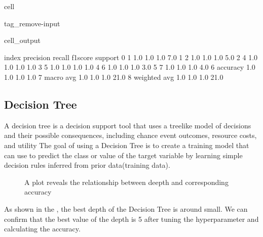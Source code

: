 \documentclass[letterpaper,10pt,english]{jupyterBook}
\let\sphinxpxdimen\pdfpxdimen\else\newdimen\sphinxpxdimen
\begin{document}
\begin{sphinxuseclass}{cell}
\begin{sphinxuseclass}{tag_remove-input}\begin{sphinxVerbatimOutput}

\begin{sphinxuseclass}{cell_output}
\begin{sphinxVerbatim}[commandchars=\\\{\}]
          index  precision  recall  f1\PYGZhy{}score  support
0             1        1.0     1.0       1.0      7.0
1             2        1.0     1.0       1.0      5.0
2             4        1.0     1.0       1.0      1.0
3             5        1.0     1.0       1.0      1.0
4             6        1.0     1.0       1.0      3.0
5             7        1.0     1.0       1.0      4.0
6      accuracy        1.0     1.0       1.0      1.0
7     macro avg        1.0     1.0       1.0     21.0
8  weighted avg        1.0     1.0       1.0     21.0
\end{sphinxVerbatim}

\end{sphinxuseclass}\end{sphinxVerbatimOutput}

\end{sphinxuseclass}
\end{sphinxuseclass}

\subsection{Decision Tree}
\label{\detokenize{analysis:decision-tree}}
\sphinxAtStartPar
A decision tree is a decision support tool that uses a tree\sphinxhyphen{}like model of decisions and their
possible consequences, including chance event outcomes, resource costs, and utility
The goal of using a Decision Tree is to create a training model that can use to predict
the class or value of the target variable by learning simple decision rules inferred
from prior data(training data).

\begin{figure}[htbp]
\centering
\capstart

\noindent\sphinxincludegraphics[width=500\sphinxpxdimen]{{dt_accuracy}.png}
\caption{A plot reveals the relationship between deepth and corresponding accuracy}\label{\detokenize{analysis:f3}}\end{figure}

\sphinxAtStartPar
As shown in the {\hyperref[\detokenize{analysis:f3}]{}}, the best depth of the Decision Tree is around small. We can confirm that the best value of the depth is 5 after tuning the hyperparameter and calculating the accuracy.
\end{document}
